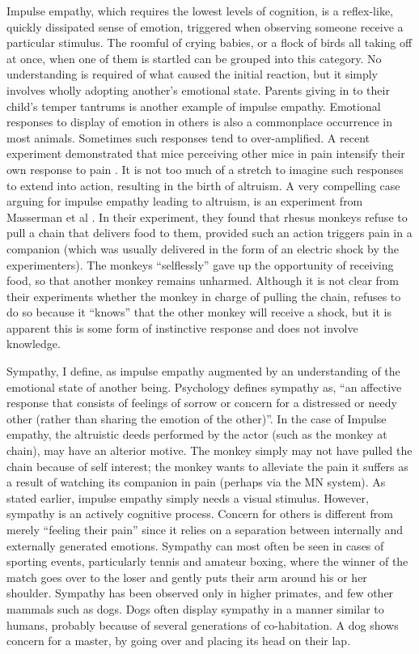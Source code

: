 \documentclass[12pt, letter]{article}
\begin{document}
Impulse empathy, which requires the lowest levels of cognition, is a reflex-like, quickly dissipated sense of emotion, triggered when observing someone receive a particular stimulus. The roomful of crying babies, or a flock of birds all taking off at once, when one of them is startled can be grouped into this category. No understanding is required of what caused the initial reaction, but it simply involves wholly adopting another's emotional state. Parents giving in to their child's temper tantrums is another example of impulse empathy. Emotional responses to display of emotion in others is also a commonplace occurrence in most animals. Sometimes such responses tend to over-amplified. A recent experiment demonstrated that mice perceiving other mice in pain intensify their own response to pain \cite{langford2006social}. It is not too much of a stretch to imagine such responses to extend into action, resulting in the birth of altruism. A very compelling case arguing for impulse empathy leading to altruism, is an experiment from Masserman et al \cite{masserman1964altruistic}. In their experiment, they found that rhesus monkeys refuse to pull a chain that delivers food to them, provided such an action triggers pain in a companion (which was usually delivered in the form of an electric shock by the experimenters). The monkeys ``selflessly'' gave up the opportunity of receiving food, so that another monkey remains unharmed. Although it is not clear from their experiments whether the monkey in charge of pulling the chain, refuses to do so because it ``knows'' that the other monkey will receive a shock, but it is apparent this is some form of instinctive response and does not involve knowledge.

Sympathy, I define, as impulse empathy augmented by an understanding of the emotional state of another being. Psychology defines sympathy as, ``an affective response that consists of feelings of sorrow or concern for a distressed or needy other (rather than sharing the emotion of the other)''. In the case of Impulse empathy, the altruistic deeds performed by the actor (such as the monkey at chain), may have an alterior motive. The monkey simply may not have pulled the chain because of self interest; the monkey wants to alleviate the pain it suffers as a result of watching its companion in pain (perhaps via the MN system). As stated earlier, impulse empathy simply needs a visual stimulus. However, sympathy is an actively cognitive process. Concern for others is different from merely ``feeling their pain'' since it relies on a separation between internally and externally generated emotions. Sympathy can most often be seen in cases of sporting events, particularly tennis and amateur boxing, where the winner of the match goes over to the loser and gently puts their arm around his or her shoulder. Sympathy has been observed only in higher primates, and few other mammals such as dogs. Dogs often display sympathy in a manner similar to humans, probably because of several generations of co-habitation. A dog shows concern for a master, by going over and placing its head on their lap.
\end{document}
